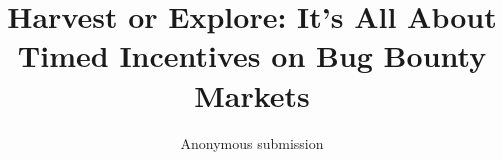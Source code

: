 \documentclass[runningheads]{llncs}
\begin{document}
\title{\large Harvest or Explore: It's All About Timed Incentives on Bug Bounty Markets}%

\author{Anonymous submission}
\date{}

\maketitle

\begin{abstract}

\end{abstract}




%







\clearpage

\end{document}
